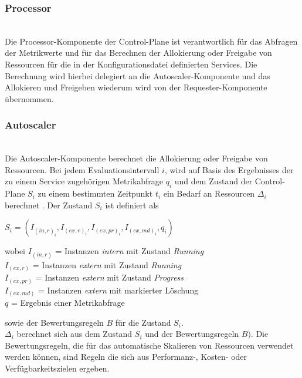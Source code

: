 \documentclass[runningheads]{llncs}
\begin{document}
\subsubsection{Processor} \hfill\\

Die Processor-Komponente der Control-Plane ist verantwortlich für das Abfragen der Metrikwerte und für das Berechnen der Allokierung oder Freigabe von Ressourcen für die in der Konfigurationsdatei definierten Services. Die Berechnung wird hierbei delegiert an die Autoscaler-Komponente und das Allokieren und Freigeben wiederum wird von der Requester-Komponente übernommen.
	
\subsubsection{Autoscaler} \label{autoscaler} \hfill\\

Die Autoscaler-Komponente berechnet die Allokierung oder Freigabe von Ressourcen. Bei jedem Evaluationsintervall $i$, wird auf Basis des Ergebnisses der zu einem Service zugehörigen Metrikabfrage $q_{i}$ und dem Zustand der Control-Plane $S_{i}$ zu einem bestimmten Zeitpunkt $t_{i}$ ein Bedarf an Ressourcen $\Delta _{i}$ berechnet . Der Zustand $S_{i}$ ist definiert als

\begin{center}
	$S_{i}=\left( I_{(in,r)_{i}}, I_{(ex,r)_{i}}, I_{(ex,pr)_{i}},  I_{(ex,md)_{i}} , q_{i} \right)$
\end{center}

wobei
	$I_{(in,r)}$ = Instanzen \textit{intern} mit Zustand \textit{Running} \\
	$I_{(ex,r)}$ = Instanzen \textit{extern} mit Zustand \textit{Running} \\
	$I_{(ex,pr)}$ = Instanzen \textit{extern} mit Zustand \textit{Progress} \\
	$I_{(ex,md)}$ = Instanzen \textit{extern} mit markierter Löschung \\
	$q$ = Ergebnis einer Metrikabfrage

sowie der Bewertungsregeln  $B$ für die Zustand $S_{i}$. \\

$\Delta _{i}$ berechnet sich aus dem Zustand $S_{i}$ und der Bewertungsregeln $B)$. Die Bewertungsregeln, die für das automatische Skalieren von Ressourcen verwendet werden können, sind Regeln die sich aus Performanz-, Kosten- oder Verfügbarkeitszielen ergeben.\\
\end{document}
